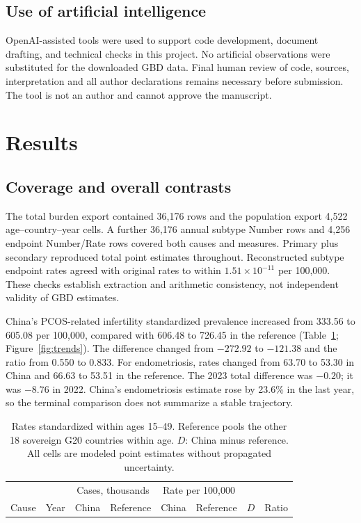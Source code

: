 \documentclass[11pt,a4paper]{article}
\begin{document}
\subsection{Use of artificial intelligence}
OpenAI-assisted tools were used to support code development, document drafting, and technical checks in this project. No artificial observations were substituted for the downloaded GBD data. Final human review of code, sources, interpretation and all author declarations remains necessary before submission. The tool is not an author and cannot approve the manuscript.

\section{Results}
\subsection{Coverage and overall contrasts}
The total burden export contained 36,176 rows and the population export 4,522 age--country--year cells. A further 36,176 annual subtype Number rows and 4,256 endpoint Number/Rate rows covered both causes and measures. Primary plus secondary reproduced total point estimates throughout. Reconstructed subtype endpoint rates agreed with original rates to within $1.51\times10^{-11}$ per 100,000. These checks establish extraction and arithmetic consistency, not independent validity of GBD estimates.

China's PCOS-related infertility standardized prevalence increased from 333.56 to 605.08 per 100,000, compared with 606.48 to 726.45 in the reference (Table~\ref{tab:prevalence}; Figure~\ref{fig:trends}). The difference changed from $-272.92$ to $-121.38$ and the ratio from 0.550 to 0.833. For endometriosis, rates changed from 63.70 to 53.30 in China and 66.63 to 53.51 in the reference. The 2023 total difference was $-0.20$; it was $-8.76$ in 2022. China's endometriosis estimate rose by 23.6\% in the last year, so the terminal comparison does not summarize a stable trajectory.



\begin{table}[htbp]\centering\small{}
\caption{Total infertility prevalence in China and the reference population.}\label{tab:prevalence}
\setlength{\tabcolsep}{3.5pt}
\begin{tabular}{llrrrrrr}\toprule
 & & \multicolumn{2}{c}{Cases, thousands} & \multicolumn{2}{c}{Rate per 100,000} & & \\
Cause & Year & China & Reference & China & Reference & $D$ & Ratio\\\midrule
\end{tabular}
\caption*{Rates standardized within ages 15--49. Reference pools the other 18 sovereign G20 countries within age. $D$: China minus reference. All cells are modeled point estimates without propagated uncertainty.}
\end{table}
\end{document}

